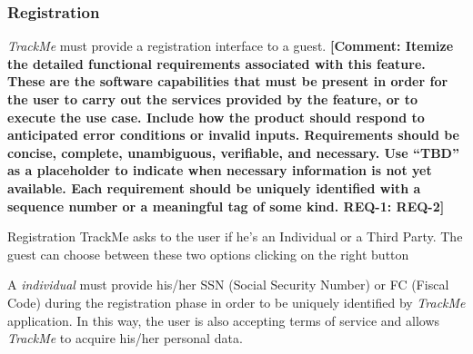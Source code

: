\documentclass[a4paper]{article}
\newcommand{\comment}[1]{\textbf{[Comment: #1]}}
\begin{document}
        
        \subsubsection{Registration}


        \textit{TrackMe} must provide a registration interface to a guest. 
        \comment{Itemize the detailed functional requirements associated with this feature. These are the software capabilities that must be present in order for the user to carry out the services provided by the feature, or to execute the use case. Include how the product should respond to anticipated error conditions or invalid inputs. Requirements should be concise, complete, unambiguous, verifiable, and necessary. Use “TBD” as a placeholder to indicate when necessary information is not yet available. Each requirement should be uniquely identified with a sequence number or a meaningful tag of some kind. REQ-1:	REQ-2}
        \begin{usecase}{Registration}
              {TrackMe asks to the user if he's an Individual or a Third Party. The guest can choose between these two options clicking on the right button}
        \end{usecase}
        
        
        A  \textit{individual} must provide his/her SSN (Social Security Number) or FC (Fiscal Code) during the registration phase in order to be uniquely identified by \textit{TrackMe} application. In this way, the user is also accepting terms of service and allows \textit{TrackMe} to acquire his/her personal data.
        
        
\end{document}
